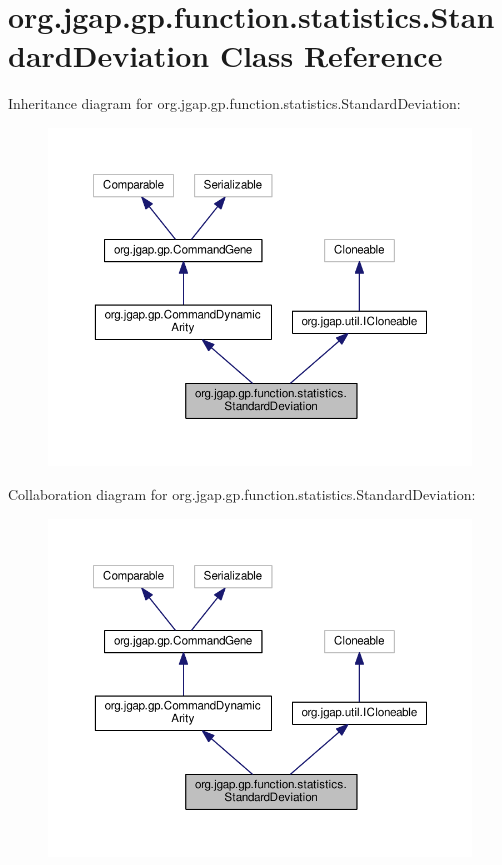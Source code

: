 \hypertarget{classorg_1_1jgap_1_1gp_1_1function_1_1statistics_1_1_standard_deviation}{\section{org.\-jgap.\-gp.\-function.\-statistics.\-Standard\-Deviation Class Reference}
\label{classorg_1_1jgap_1_1gp_1_1function_1_1statistics_1_1_standard_deviation}
}


Inheritance diagram for org.\-jgap.\-gp.\-function.\-statistics.\-Standard\-Deviation\-:
\nopagebreak
\begin{figure}[H]
\begin{center}
\leavevmode
\includegraphics[width=350pt]{classorg_1_1jgap_1_1gp_1_1function_1_1statistics_1_1_standard_deviation__inherit__graph}
\end{center}
\end{figure}


Collaboration diagram for org.\-jgap.\-gp.\-function.\-statistics.\-Standard\-Deviation\-:
\nopagebreak
\begin{figure}[H]
\begin{center}
\leavevmode
\includegraphics[width=350pt]{classorg_1_1jgap_1_1gp_1_1function_1_1statistics_1_1_standard_deviation__coll__graph}
\end{center}
\end{figure}
